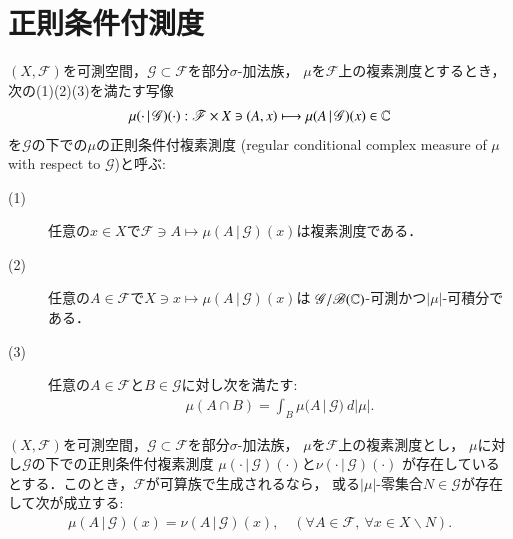 \section{正則条件付測度}
	\begin{screen}
		\begin{dfn}[正則条件付複素測度]
			$(X,\mathscr{F})$を可測空間，$\mathscr{G} \subset \mathscr{F}$を部分$\sigma$-加法族，
			$\mu$を$\mathscr{F}$上の複素測度とするとき，次の(1)(2)(3)を満たす写像
			\begin{align}
				\mu(\cdot\, |\, \mathscr{G})(\cdot):
				\mathscr{F} \times X \ni (A,x) \longmapsto \mu(A\, |\, \mathscr{G})(x) \in \mathbb{C}
			\end{align}
			を$\mathscr{G}$の下での$\mu$の正則条件付複素測度
			(regular conditional complex measure of $\mu$ with respect to $\mathscr{G}$)と呼ぶ:
			\begin{description}
				\item[(1)] 任意の$x \in X$で$\mathscr{F} \ni A \longmapsto \mu(A\, |\, \mathscr{G})(x)$は複素測度である．
				\item[(2)] 任意の$A \in \mathscr{F}$で$X \ni x \longmapsto \mu(A\, |\, \mathscr{G})(x)$は
					$\mathscr{G}/\mathscr{B}(\mathbb{C})$-可測かつ$|\mu|$-可積分である．
				\item[(3)] 任意の$A \in \mathscr{F}$と$B \in \mathscr{G}$に対し次を満たす:
					\begin{align}
						\mu(A \cap B) = \int_B \mu(A\, |\, \mathscr{G})\ d|\mu|.
					\end{align}
			\end{description}
		\end{dfn}
	\end{screen}
	
	\begin{screen}
		\begin{thm}[正則条件付複素測度の一意性]
			$(X,\mathscr{F})$を可測空間，$\mathscr{G} \subset \mathscr{F}$を部分$\sigma$-加法族，
			$\mu$を$\mathscr{F}$上の複素測度とし，
			$\mu$に対し$\mathscr{G}$の下での正則条件付複素測度
			$\mu(\cdot\, |\, \mathscr{G})(\cdot)$と$\nu(\cdot\, |\, \mathscr{G})(\cdot)$
			が存在しているとする．このとき，$\mathscr{F}$が可算族で生成されるなら，
			或る$|\mu|$-零集合$N \in \mathscr{G}$が存在して次が成立する:
			\begin{align}
				\mu(A\, |\, \mathscr{G})(x) = \nu(A\, |\, \mathscr{G})(x),
				\quad (\forall A \in \mathscr{F},\ \forall x \in X \backslash N).
			\end{align}
		\end{thm}
	\end{screen}
	
